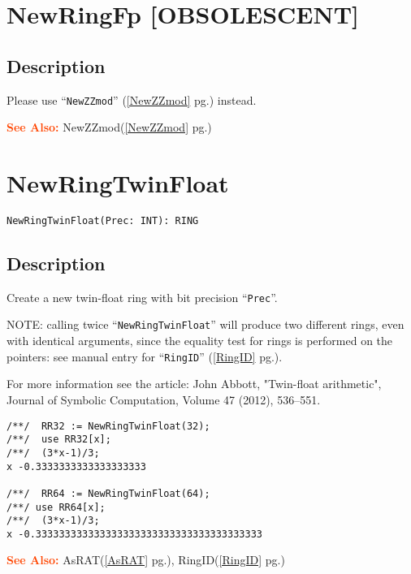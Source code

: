 \documentclass[a4paper]{mybook}
\newenvironment{command}{}{} %
\newcommand\SeeAlso{\par\textcolor{OrangeRed}{\textbf{\large See Also: }}}
\begin{document}
\section{NewRingFp [OBSOLESCENT]}
\label{NewRingFp [OBSOLESCENT]}
\begin{command} %



\subsection*{Description}

Please use ``\verb&NewZZmod&'' (\ref{NewZZmod} pg.\pageref{NewZZmod}) instead.

\SeeAlso %
  NewZZmod(\ref{NewZZmod} pg.\pageref{NewZZmod})
\end{command} %

\section{NewRingTwinFloat}
\label{NewRingTwinFloat}
\begin{command} %


\begin{Verbatim}[label=syntax, rulecolor=\color{MidnightBlue},
frame=single]
NewRingTwinFloat(Prec: INT): RING
\end{Verbatim}


\subsection*{Description}

Create a new twin-float ring with bit precision ``\verb&Prec&''.
\par 
NOTE: calling twice ``\verb&NewRingTwinFloat&'' will produce two different
rings, even with identical arguments, since the equality test for
rings is performed on the pointers: see manual entry for ``\verb&RingID&'' (\ref{RingID} pg.\pageref{RingID}).

\par 
For more information see the article:
John Abbott, "Twin-float arithmetic",
Journal of Symbolic Computation, Volume 47 (2012), 536--551.
\begin{Verbatim}[label=example, rulecolor=\color{PineGreen}, frame=single]
/**/  RR32 := NewRingTwinFloat(32);
/**/  use RR32[x];
/**/  (3*x-1)/3;
x -0.3333333333333333333

/**/  RR64 := NewRingTwinFloat(64);
/**/ use RR64[x];
/**/  (3*x-1)/3;
x -0.333333333333333333333333333333333333333
\end{Verbatim}


\SeeAlso %
  AsRAT(\ref{AsRAT} pg.\pageref{AsRAT}), 
    RingID(\ref{RingID} pg.\pageref{RingID})
\end{command} %
\end{document}
